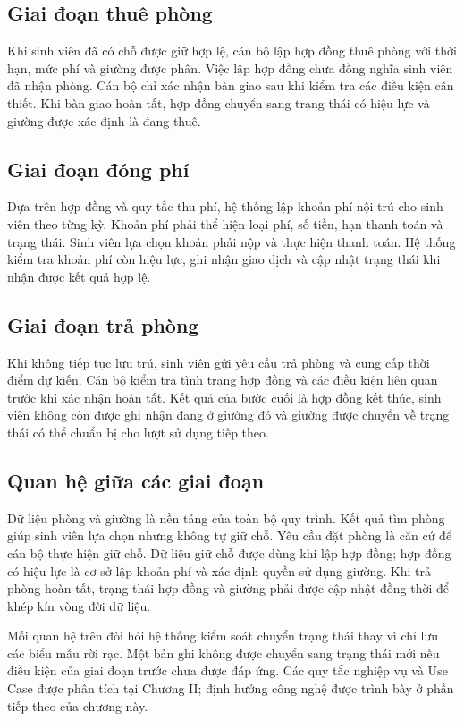 \subsection{Giai đoạn thuê phòng}

Khi sinh viên đã có chỗ được giữ hợp lệ, cán bộ lập hợp đồng thuê phòng với thời hạn, mức phí và giường được phân. Việc lập hợp đồng chưa đồng nghĩa sinh viên đã nhận phòng. Cán bộ chỉ xác nhận bàn giao sau khi kiểm tra các điều kiện cần thiết. Khi bàn giao hoàn tất, hợp đồng chuyển sang trạng thái có hiệu lực và giường được xác định là đang thuê.

\subsection{Giai đoạn đóng phí}

Dựa trên hợp đồng và quy tắc thu phí, hệ thống lập khoản phí nội trú cho sinh viên theo từng kỳ. Khoản phí phải thể hiện loại phí, số tiền, hạn thanh toán và trạng thái. Sinh viên lựa chọn khoản phải nộp và thực hiện thanh toán. Hệ thống kiểm tra khoản phí còn hiệu lực, ghi nhận giao dịch và cập nhật trạng thái khi nhận được kết quả hợp lệ.

\subsection{Giai đoạn trả phòng}

Khi không tiếp tục lưu trú, sinh viên gửi yêu cầu trả phòng và cung cấp thời điểm dự kiến. Cán bộ kiểm tra tình trạng hợp đồng và các điều kiện liên quan trước khi xác nhận hoàn tất. Kết quả của bước cuối là hợp đồng kết thúc, sinh viên không còn được ghi nhận đang ở giường đó và giường được chuyển về trạng thái có thể chuẩn bị cho lượt sử dụng tiếp theo.

\subsection{Quan hệ giữa các giai đoạn}

Dữ liệu phòng và giường là nền tảng của toàn bộ quy trình. Kết quả tìm phòng giúp sinh viên lựa chọn nhưng không tự giữ chỗ. Yêu cầu đặt phòng là căn cứ để cán bộ thực hiện giữ chỗ. Dữ liệu giữ chỗ được dùng khi lập hợp đồng; hợp đồng có hiệu lực là cơ sở lập khoản phí và xác định quyền sử dụng giường. Khi trả phòng hoàn tất, trạng thái hợp đồng và giường phải được cập nhật đồng thời để khép kín vòng đời dữ liệu.

Mối quan hệ trên đòi hỏi hệ thống kiểm soát chuyển trạng thái thay vì chỉ lưu các biểu mẫu rời rạc. Một bản ghi không được chuyển sang trạng thái mới nếu điều kiện của giai đoạn trước chưa được đáp ứng. Các quy tắc nghiệp vụ và Use Case được phân tích tại Chương II; định hướng công nghệ được trình bày ở phần tiếp theo của chương này.


